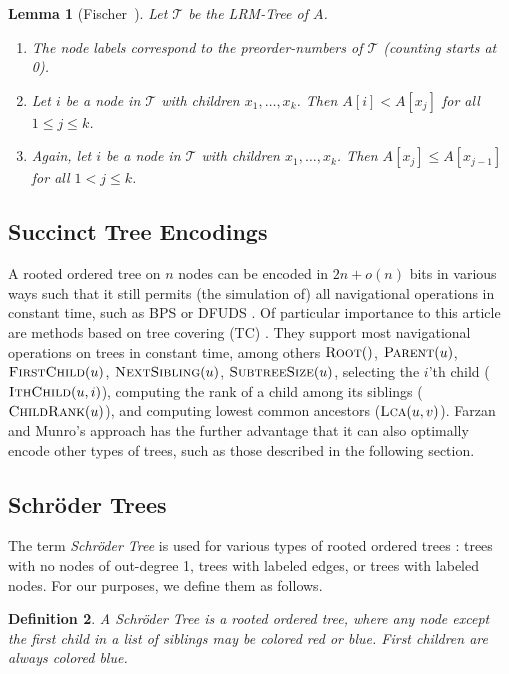 \documentclass[11pt,onecolumn,final]{article} \usepackage{a4}
\newcommand{\lca}{\ensuremath{\textsc{Lca}}}
\newcommand{\sroot}{\ensuremath{\textsc{Root}}}
\newcommand{\ssize}{\ensuremath{\textsc{SubtreeSize}}}
\newcommand{\parent}{\ensuremath{\textsc{Parent}}}
\newcommand{\fchild}{\ensuremath{\textsc{FirstChild}}}
\newcommand{\nsibling}{\ensuremath{\textsc{NextSibling}}}
\newcommand{\ithchild}{\ensuremath{\textsc{IthChild}}}
\newcommand{\childrank}{\ensuremath{\textsc{ChildRank}}}
\theoremstyle{plain}
\newtheorem{definition}{Definition}
\newtheorem{lemma}[definition]{Lemma}
\theoremstyle{remark}
\begin{document}
\begin{lemma}[Fischer~\cite{fischer10optimal}]
  \label{lemma:basic}
  Let $\mathcal{T}$ be the LRM-Tree of $A$.
  \begin{enumerate}
  \item The node labels correspond to the preorder-numbers of $\mathcal{T}$ (counting starts at 0).
  \item Let $i$ be a node in $\mathcal{T}$ with children $x_1,\dots,x_k$. Then $A[i] < A[x_j]$ for all $1 \le j \le k$.
  \item Again, let $i$ be a node in $\mathcal{T}$ with children $x_1,\dots,x_k$. Then $A[x_j] \le A[x_{j-1}]$ for all $1 < j \le k$.
  \end{enumerate}
\end{lemma}

\subsection{Succinct Tree Encodings}
\label{sect:succinct_trees}
A rooted ordered tree on $n$ nodes can be encoded in $2n+o(n)$ bits in various ways such that it still permits (the simulation of) all navigational operations in constant time, such as BPS \cite{munro01succinct} or DFUDS \cite{benoit05representing}. Of particular importance to this article are methods based on tree covering (TC) \cite{geary06succinct,he07succinct,farzan08uniform}. They support most navigational operations on trees in constant time, among others $\sroot()$, $\parent(u)$, $\fchild(u)$, $\nsibling(u)$, $\ssize(u)$, selecting the $i$'th child ($\ithchild(u,i)$), computing the rank of a child among its siblings ($\childrank(u)$), and computing lowest common ancestors ($\lca(u,v)$). Farzan and Munro's approach \cite{farzan08uniform} has the further advantage that it can also optimally encode other types of trees, such as those described in the following section.

\subsection{Schr\"oder Trees}
\label{sect:schroeder}
The term \emph{Schr\"oder Tree} is used for various types of rooted ordered trees \cite{stanley99enumerative}: trees with no nodes of out-degree 1, trees with labeled edges, or trees with labeled nodes. For our purposes, we define them as follows.

\begin{definition}
  A \emph{Schr\"oder Tree} is a rooted ordered tree, where any node except the first child in a list of siblings may be colored red or blue. First children are always colored blue.
\end{definition}
\end{document}
